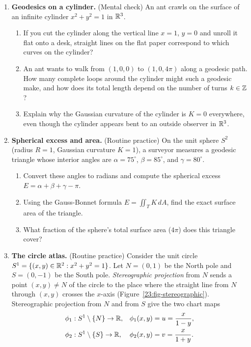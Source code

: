 \begin{enumerate}
\item \textbf{Geodesics on a cylinder.} (Mental check)
An ant crawls on the surface of an infinite cylinder $x^2 + y^2 = 1$ in $\mathbb{R}^3$.
\begin{enumerate}
\item If you cut the cylinder along the vertical line $x = 1$, $y = 0$ and unroll it flat onto a desk, straight lines on the flat paper correspond to which curves on the cylinder?
\item An ant wants to walk from $(1, 0, 0)$ to $(1, 0, 4\pi)$ along a geodesic path. How many complete loops around the cylinder might such a geodesic make, and how does its total length depend on the number of turns $k \in \mathbb{Z}$?
\item Explain why the Gaussian curvature of the cylinder is $K = 0$ everywhere, even though the cylinder appears bent to an outside observer in $\mathbb{R}^3$.
\end{enumerate}

\item \textbf{Spherical excess and area.} (Routine practice)
On the unit sphere $S^2$ (radius $R = 1$, Gaussian curvature $K = 1$), a surveyor measures a geodesic triangle whose interior angles are $\alpha = 75^\circ$, $\beta = 85^\circ$, and $\gamma = 80^\circ$.
\begin{enumerate}
\item Convert these angles to radians and compute the spherical excess $E = \alpha + \beta + \gamma - \pi$.
\item Using the Gauss-Bonnet formula $E = \iint_T K \, dA$, find the exact surface area of the triangle.
\item What fraction of the sphere's total surface area ($4\pi$) does this triangle cover?
\end{enumerate}

\item \textbf{The circle atlas.} (Routine practice)
Consider the unit circle $S^1 = \{(x, y) \in \mathbb{R}^2 : x^2 + y^2 = 1\}$. Let $N = (0, 1)$ be the North pole and $S = (0, -1)$ be the South pole. \emph{Stereographic projection} from $N$ sends a point $(x, y) \neq N$ of the circle to the place where the straight line from $N$ through $(x, y)$ crosses the $x$-axis (Figure~\ref{23:fig-stereographic}). Stereographic projection from $N$ and from $S$ give the two chart maps
\begin{align*}
\phi_1 &: S^1 \setminus \{N\} \to \mathbb{R}, & \phi_1(x, y) &= u = \frac{x}{1 - y},\\
\phi_2 &: S^1 \setminus \{S\} \to \mathbb{R}, & \phi_2(x, y) &= v = \frac{x}{1 + y}.
\end{align*}


\end{enumerate}
